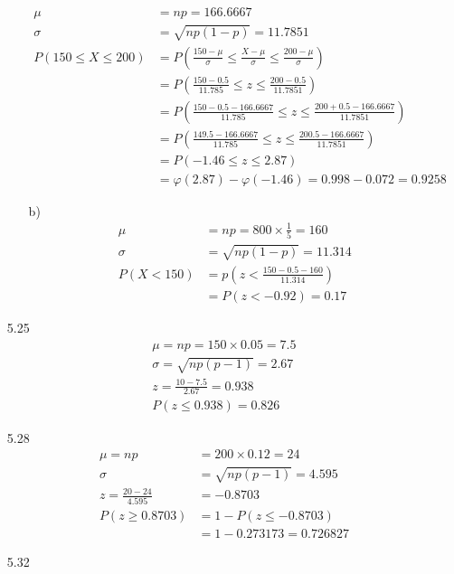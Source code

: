 \documentclass{article}
\begin{document}
\begin{itemize}
\begin{itemize}
\begin{align*}
            \mu &= np = 166.6667\\
            \sigma &= \sqrt{np(1-p)} = 11.7851\\
            P\left(150 \leq X \leq 200\right) &= P\left(\frac{150 - \mu }{\sigma } \leq \frac{X - \mu }{\sigma } \leq \frac{200 - \mu }{\sigma }\right)\\ &= P\left(\frac{150 - 0. 5}{11. 785} \leq z \leq \frac{200 - 0. 5}{11. 7851}\right)\\ 
            &= P\left(\frac{150 - 0. 5 - 166. 6667}{11. 785} \leq z \leq \frac{200 + 0. 5 - 166. 6667}{11. 7851}\right) \\
            &= P\left(\frac{149. 5 - 166. 6667}{11. 785} \leq z \leq \frac{200. 5 - 166. 6667}{11. 7851}\right)\\ &= P\left( - 1. 46 \leq z \leq 2. 87\right) \\&= \varphi \left(2. 87\right) - \varphi \left( - 1. 46\right) = 0. 998 - 0. 072 = 0. 9258
        \end{align*}
        \item [b)]
        \begin{align*}
            \mu &= np = 800\times \frac{1}{5}=160\\
            \sigma &= \sqrt{np(1-p)} = 11.314\\
            P(X<150)&= p(z<\frac{150-0.5-160}{11.314})\\
            &=P(z<-0.92) = 0.17
        \end{align*}
    \end{itemize}
    \item [5.25]
    \begin{align*}
        \mu = np = 150\times 0.05 = 7.5\\
        \sigma = \sqrt{np(p-1)}=2.67\\
        z = \frac{10-7.5}{2.67}=0.938\\
        P(z\leq 0.938) = 0.826
    \end{align*}
    \item [5.28]
    \begin{align*}
        \mu = np &= 200\times 0.12 = 24\\
        \sigma &= \sqrt{np(p-1)}=4.595\\
        z = \frac{20-24}{4.595}&=-0.8703\\
        P(z\geq 0.8703) &= 1-P(z\leq -0.8703) \\ &= 1-0.273173 = 0.726827
    \end{align*}
    \item [5.32]

\end{itemize}
\end{document}
